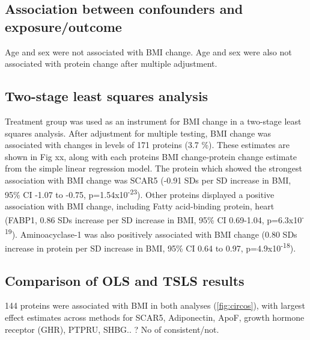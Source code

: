\documentclass[11pt,twoside]{bristolthesis}
\begin{document}
\hypertarget{association-between-confounders-and-exposureoutcome}{%
\subsection{Association between confounders and exposure/outcome}\label{association-between-confounders-and-exposureoutcome}}

Age and sex were not associated with BMI change. Age and sex were also not associated with protein change after multiple adjustment.

\hypertarget{two-stage-least-squares-analysis}{%
\subsection{Two-stage least squares analysis}\label{two-stage-least-squares-analysis}}

Treatment group was used as an instrument for BMI change in a two-stage least squares analysis. After adjustment for multiple testing, BMI change was associated with changes in levels of 171 proteins (3.7 \%). These estimates are shown in Fig xx, along with each proteins BMI change-protein change estimate from the simple linear regression model. The protein which showed the strongest association with BMI change was SCAR5 (-0.91 SDs per SD increase in BMI, 95\% CI -1.07 to -0.75, p=1.54x10\textsuperscript{-23}). Other proteins displayed a positive association with BMI change, including Fatty acid-binding protein, heart (FABP1, 0.86 SDs increase per SD increase in BMI, 95\% CI 0.69-1.04, p=6.3x10\textsuperscript{-19}). Aminoacyclase-1 was also positively associated with BMI change (0.80 SDs increase in protein per SD increase in BMI, 95\% CI 0.64 to 0.97, p=4.9x10\textsuperscript{-18}).

\hypertarget{comparison-of-ols-and-tsls-results}{%
\subsection{Comparison of OLS and TSLS results}\label{comparison-of-ols-and-tsls-results}}

144 proteins were associated with BMI in both analyses (\ref{fig:circos}), with largest effect estimates across methods for SCAR5, Adiponectin, ApoF, growth hormone receptor (GHR), PTPRU, SHBG.. ? No of consistent/not.
\end{document}
